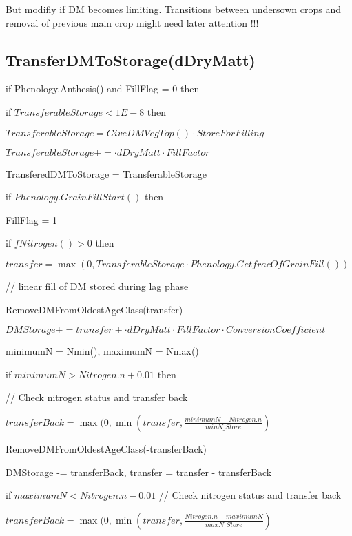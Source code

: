 \documentclass[%
]{scrartcl}
\begin{document}
 But modifiy if DM becomes limiting. Transitions between undersown crops and removal of previous main crop might need later attention !!!

\subsection{TransferDMToStorage(dDryMatt)}


	if Phenology.Anthesis()  and  FillFlag = 0 then
  
   \quad 	if $TransferableStorage<1E-8$ then

    \quad \quad   	$TransferableStorage = GiveDMVegTop() \cdot StoreForFilling$

     \quad \quad  $TransferableStorage +=  \cdot dDryMatt \cdot FillFactor$

    \quad \quad   TransferedDMToStorage = TransferableStorage



   
   if $Phenology.GrainFillStart()$ then
 
   \quad 	FillFlag = 1

    \quad   if $fNitrogen() > 0$ then
    
    \quad \quad   	$transfer = \max(0,TransferableStorage \cdot Phenology.GetfracOfGrainFill())$     

\quad \quad  //  linear fill of DM stored during lag phase
    
  \quad \quad    RemoveDMFromOldestAgeClass(transfer)
   
 \quad \quad     $ DMStorage += transfer+ \cdot dDryMatt \cdot FillFactor \cdot ConversionCoefficient$


    \quad \quad		minimumN = Nmin(),
   		maximumN = Nmax()

     \quad \quad  	if $minimumN > Nitrogen.n + 0.01$ then    

  \quad \quad  // Check nitrogen status and transfer back
       
      \quad \quad  \quad     $ transferBack = \max(0,\min(transfer,\tfrac{minimumN - Nitrogen.n}{minN\_Store})$

     \quad \quad \quad     	RemoveDMFromOldestAgeClass(-transferBack)

       \quad \quad \quad   	DMStorage -= transferBack, transfer = transfer - transferBack
      
\quad \quad   
   		if $maximumN < Nitrogen.n - 0.01$     // Check nitrogen status and transfer back
   		
    \quad \quad \quad         $transferBack = \max(0,\min(transfer,\tfrac{Nitrogen.n - maximumN}{maxN\_Store})$
  
\end{document}
